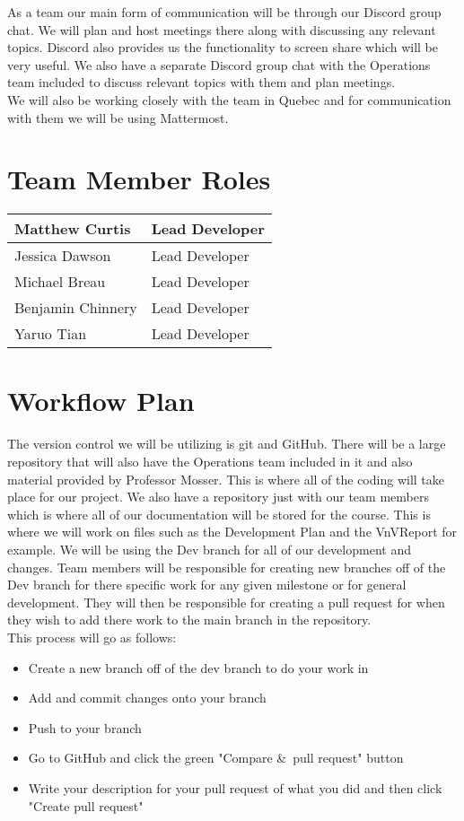 \documentclass{article}
\begin{document}
As a team our main form of communication will be through our Discord group chat. We will plan and host meetings there along with discussing any relevant topics. Discord also provides us the functionality to screen share which will be very useful. We also have a separate Discord group chat with the Operations team included to discuss relevant topics with them and plan meetings.\\
We will also be working closely with the team in Quebec and for communication with them we will be using Mattermost.
\section{Team Member Roles}
\begin{center}
\begin{tabular}{ | m{3cm}| m{7cm} | } 
  \hline
  Matthew Curtis & Lead Developer \\ 
  \hline
  Jessica Dawson & Lead Developer \\ 
  \hline
  Michael Breau & Lead Developer \\ 
 \hline
  Benjamin Chinnery & Lead Developer \\ 
 \hline
  Yaruo Tian & Lead Developer \\ 
  \hline
\end{tabular}
\end{center}
\section{Workflow Plan}

The version control we will be utilizing is git and GitHub. There will be a large repository that will also have the Operations team included in it and also material provided by Professor Mosser. This is where all of the coding will take place for our project. We also have a repository just with our team members which is where all of our documentation will be stored for the course. This is where we will work on files such as the Development Plan and the VnVReport for example. We will be using the Dev branch for all of our development and changes. Team members will be responsible for creating new branches off of the Dev branch for there specific work for any given milestone or for general development. They will then be responsible for creating a pull request for when they wish to add there work to the main branch in the repository. \\

This process will go as follows:
\begin{itemize}
  \item Create a new branch off of the dev branch to do your work in
    \item Add and commit changes onto your branch
  \item Push to your branch
\item Go to GitHub and click the green "Compare \&\ pull request" button
  \item Write your description for your pull request of what you did and then click "Create pull request"
\end{itemize}
\end{document}

